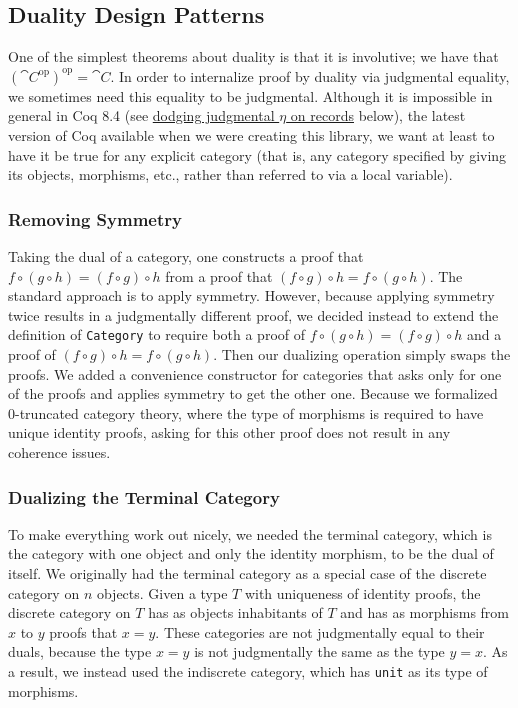   \subsection{Duality Design Patterns}
    One of the simplest theorems about duality is that it is involutive; we have that $(\cat{C}^{\text{op}})^{\text{op}} = \cat{C}$.
    In order to internalize proof by duality via judgmental equality, we sometimes need this equality to be judgmental.
    Although it is impossible in general in Coq 8.4 (see \hyperref[sec:no-judgmental-eta]{dodging judgmental \texorpdfstring{$\eta$}{η} on records} below), the latest version of Coq available when we were creating this library, we want at least to have it be true for any explicit category (that is, any category specified by giving its objects, morphisms, etc., rather than referred to via a local variable).

    \subsubsection{Removing Symmetry} \label{sec:remove-symmetry}
      Taking the dual of a category, one constructs a proof that $f \circ (g \circ h) = (f \circ g) \circ h$ from a proof that $(f \circ g) \circ h = f \circ (g \circ h)$.
      The standard approach is to apply symmetry.
      However, because applying symmetry twice results in a judgmentally different proof, we decided instead to extend the definition of \texttt{Category} to require both a proof of $f \circ (g \circ h) = (f \circ g) \circ h$ and a proof of $(f \circ g) \circ h = f \circ (g \circ h)$.
      Then our dualizing operation simply swaps the proofs.
      We added a convenience constructor for categories that asks only for one of the proofs and applies symmetry to get the other one.
      Because we formalized 0-truncated category theory, where the type of morphisms is required to have unique identity proofs, asking for this other proof does not result in any coherence issues.

    \subsubsection{Dualizing the Terminal Category}
      To make everything work out nicely, we needed the terminal category, which is the category with one object and only the identity morphism, to be the dual of itself.
      We originally had the terminal category as a special case of the discrete category on $n$ objects.
      Given a type $T$ with uniqueness of identity proofs, the discrete category on $T$ has as objects inhabitants of $T$ and has as morphisms from $x$ to $y$ proofs that $x = y$.
      These categories are not judgmentally equal to their duals, because the type $x = y$ is not judgmentally the same as the type $y = x$.
      As a result, we instead used the indiscrete category, which has \texttt{unit} as its type of morphisms.

